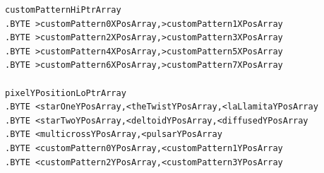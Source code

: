 \begin{minipage}[b]{0.33\linewidth}
\begin{lrbox}{\mybox}
\begin{lstlisting}[basicstyle=\ttfamily\tiny]
customPatternHiPtrArray
.BYTE >customPattern0XPosArray,>customPattern1XPosArray
.BYTE >customPattern2XPosArray,>customPattern3XPosArray
.BYTE >customPattern4XPosArray,>customPattern5XPosArray
.BYTE >customPattern6XPosArray,>customPattern7XPosArray

pixelYPositionLoPtrArray
.BYTE <starOneYPosArray,<theTwistYPosArray,<laLlamitaYPosArray
.BYTE <starTwoYPosArray,<deltoidYPosArray,<diffusedYPosArray
.BYTE <multicrossYPosArray,<pulsarYPosArray
.BYTE <customPattern0YPosArray,<customPattern1YPosArray
.BYTE <customPattern2YPosArray,<customPattern3YPosArray

\end{lstlisting}
\end{lrbox}%
\scalebox{0.8}{\usebox{\mybox}}
\end{minipage}
\hspace{-0.1cm}
